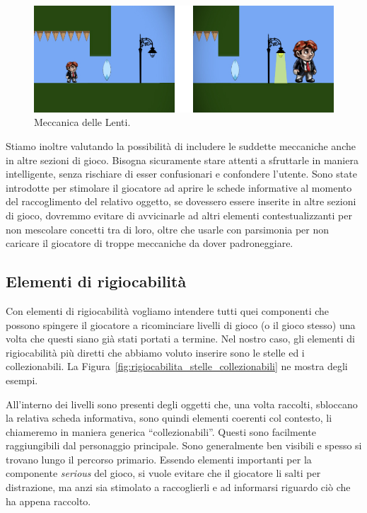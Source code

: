 \begin{figure}%
	\centering
	\includegraphics[width= 0.9\columnwidth]{images/gameDesign/24_lenti.jpg}
	\caption{Meccanica delle Lenti.}
	\label{fig:meccaniche_precinema_lenti}
\end{figure} 

Stiamo inoltre valutando la possibilità di includere le suddette meccaniche anche in altre sezioni di gioco. Bisogna sicuramente stare attenti a sfruttarle in maniera intelligente, senza rischiare di esser confusionari e confondere l’utente. Sono state introdotte per stimolare il giocatore ad aprire le schede informative al momento del raccoglimento del relativo oggetto, se dovessero essere inserite in altre sezioni di gioco, dovremmo evitare di avvicinarle ad altri elementi contestualizzanti per non mescolare concetti tra di loro, oltre che usarle con parsimonia per non caricare il giocatore di troppe meccaniche da dover padroneggiare.

\subsection{Elementi di rigiocabilità}
\label{sec:elementi_rigiocabilita}

Con elementi di rigiocabilità vogliamo intendere tutti quei componenti che possono spingere il giocatore a ricominciare livelli di gioco (o il gioco stesso) una volta che questi siano già stati portati a termine.
Nel nostro caso, gli elementi di rigiocabilità più diretti che abbiamo voluto inserire sono le stelle ed i collezionabili. La Figura~\ref{fig:rigiocabilita_stelle_collezionabili} ne mostra degli esempi.

All’interno dei livelli sono presenti degli oggetti che, una volta raccolti, sbloccano la relativa scheda informativa, sono quindi elementi coerenti col contesto, li chiameremo in maniera generica “collezionabili”. Questi sono facilmente raggiungibili dal personaggio principale. Sono generalmente ben visibili e spesso si trovano lungo il percorso primario. Essendo elementi importanti per la componente \textit{serious} del gioco, si vuole evitare che il giocatore li salti per distrazione, ma anzi sia stimolato a raccoglierli e ad informarsi riguardo ciò che ha appena raccolto.

